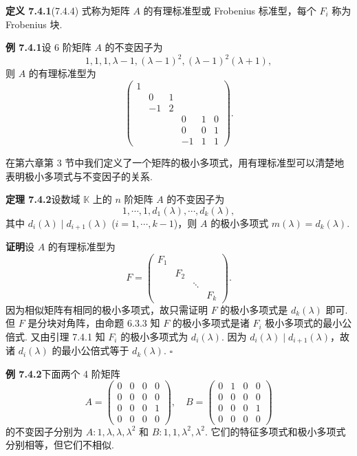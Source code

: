 \documentclass[UTF8,12pt,a4paper,fontset=fandol]{ctexart}
\begin{document}
\noindent\textbf{定义 7.4.1}\quad (7.4.4) 式称为矩阵 $A$ 的有理标准型或 Frobenius 标准型，每个 $F_i$ 称为 Frobenius 块.

\noindent\textbf{例 7.4.1}\quad 设 6 阶矩阵 $A$ 的不变因子为
\[
1,1,1,\lambda-1,(\lambda-1)^2,(\lambda-1)^2(\lambda+1),
\]
则 $A$ 的有理标准型为
\[
\left(\begin{array}{cccccc}
1 & & & & & \\
& 0 & 1 & & & \\
& -1 & 2 & & & \\
& & & 0 & 1 & 0\\
& & & 0 & 0 & 1\\
& & & -1 & 1 & 1
\end{array}\right).
\]

在第六章第 3 节中我们定义了一个矩阵的极小多项式，用有理标准型可以清楚地表明极小多项式与不变因子的关系.

\noindent\textbf{定理 7.4.2}\quad 设数域 $\mathbb{K}$ 上的 $n$ 阶矩阵 $A$ 的不变因子为
\[
1,\cdots,1,d_1(\lambda),\cdots,d_k(\lambda),
\]
其中 $d_i(\lambda)\mid d_{i+1}(\lambda)$ ($i=1,\cdots,k-1$)，则 $A$ 的极小多项式 $m(\lambda)=d_k(\lambda)$.

\noindent\textbf{证明}\quad 设 $A$ 的有理标准型为
\[
F=\left(\begin{array}{cccc}
F_1 & & & \\
& F_2 & & \\
& & \ddots & \\
& & & F_k
\end{array}\right).
\]
因为相似矩阵有相同的极小多项式，故只需证明 $F$ 的极小多项式是 $d_k(\lambda)$ 即可. 但 $F$ 是分块对角阵，由命题 6.3.3 知 $F$ 的极小多项式是诸 $F_i$ 极小多项式的最小公倍式. 又由引理 7.4.1 知 $F_i$ 的极小多项式为 $d_i(\lambda)$. 因为 $d_i(\lambda)\mid d_{i+1}(\lambda)$，故诸 $d_i(\lambda)$ 的最小公倍式等于 $d_k(\lambda)$. $\square$

\noindent\textbf{例 7.4.2}\quad 下面两个 4 阶矩阵
\[
A=\left(\begin{array}{cccc}
0 & 0 & 0 & 0\\
0 & 0 & 0 & 0\\
0 & 0 & 0 & 1\\
0 & 0 & 0 & 0
\end{array}\right),\quad
B=\left(\begin{array}{cccc}
0 & 1 & 0 & 0\\
0 & 0 & 0 & 0\\
0 & 0 & 0 & 1\\
0 & 0 & 0 & 0
\end{array}\right)
\]
的不变因子分别为 $A:1,\lambda,\lambda,\lambda^2$ 和 $B:1,1,\lambda^2,\lambda^2$. 它们的特征多项式和极小多项式分别相等，但它们不相似.
\end{document}
